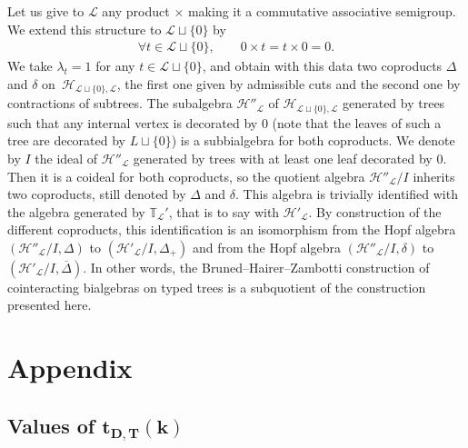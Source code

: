 \documentclass[10pt,a4paper]{amsart}
\numberwithin{equation}{section}
\renewcommand{\L}{\mathcal{L}}
\newcommand{\h}{\mathcal{H}}
\newcommand{\bfT}{\mathbb{T}}
\begin{document}
Let us give to $\L$ any product $\times$ making it a commutative associative semigroup.
We extend this structure to $\L\sqcup \{0\}$ by
\begin{gather*}
\forall t\in \L\sqcup \{0\},\qquad 0\times t=t\times 0=0.
\end{gather*}
We take $\lambda_t=1$ for any $t\in \L\sqcup\{0\}$, and obtain with this data two coproducts
$\Delta$ and $\delta$ on~$\h_{\L\sqcup\{0\}, \L}$, the first one given by admissible cuts and the second one by contractions
of subtrees. The subalgebra $\h''_\L$ of $\h_{\L\sqcup\{0\}, \L}$ generated by trees such that any internal vertex
is decorated by $0$ (note that the leaves of such a tree are decorated by $L\sqcup \{0\}$) is a subbialgebra for both coproducts.
We denote by $I$ the ideal of $\h''_\L$ generated by trees with at least one leaf decorated by $0$.
Then it is a coideal for both coproducts, so the quotient algebra $\h''_\L/I$ inherits two coproducts, still denoted by $\Delta$
and $\delta$. This algebra is trivially identified with the algebra generated by $\bfT_\L'$, that is to say
with $\h'_\L$. By construction of the different coproducts, this identification is an isomorphism from the Hopf algebra
$(\h''_\L/I,\Delta)$ to $(\h'_\L/I,\Delta_+)$ and from the Hopf algebra $(\h''_\L/I,\delta)$ to $(\h'_\L/I,\overline{\Delta})$.
In other words, the Bruned--Hairer--Zambotti construction of cointeracting bialgebras on typed trees is a subquotient
of the construction presented here.

\section{Appendix}

\subsection[Values of t D,T(k)]{Values of $\boldsymbol{t_{D,T}(k)}$}
\end{document}

